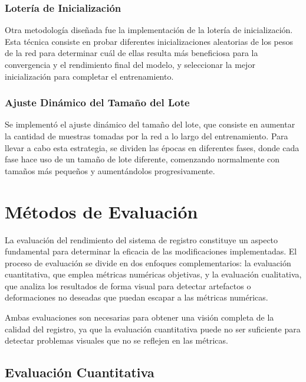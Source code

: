 \subsubsection{Lotería de Inicialización}
\label{subsubsec:loteria_inicializacion}
Otra metodología diseñada fue la implementación de la lotería de inicialización. Esta técnica consiste en probar diferentes inicializaciones aleatorias de los pesos de la red para determinar cuál de ellas resulta más beneficiosa para la convergencia y el rendimiento final del modelo, y seleccionar la mejor inicialización para completar el entrenamiento.

\subsubsection{Ajuste Dinámico del Tamaño del Lote}
\label{subsubsec:axuste_dinamico_batch_size}
Se implementó el ajuste dinámico del tamaño del lote, que consiste en aumentar la cantidad de muestras tomadas por la red a lo largo del entrenamiento. Para llevar a cabo esta estrategia, se dividen las épocas en diferentes fases, donde cada fase hace uso de un tamaño de lote diferente, comenzando normalmente con tamaños más pequeños y aumentándolos progresivamente.

\section{Métodos de Evaluación}
\label{sec:Métodos de Evaluación}

La evaluación del rendimiento del sistema de registro constituye un aspecto fundamental para determinar la eficacia de las modificaciones implementadas.
El proceso de evaluación se divide en dos enfoques complementarios: la evaluación cuantitativa, que emplea métricas numéricas objetivas, y la evaluación cualitativa, que analiza los resultados de forma visual para detectar artefactos o deformaciones no deseadas que puedan escapar a las métricas numéricas.

Ambas evaluaciones son necesarias para obtener una visión completa de la calidad del registro, ya que la evaluación cuantitativa puede no ser suficiente para detectar problemas visuales que no se reflejen en las métricas.

\subsection{Evaluación Cuantitativa}\label{subsec:Avaliación Cuantitativa}

